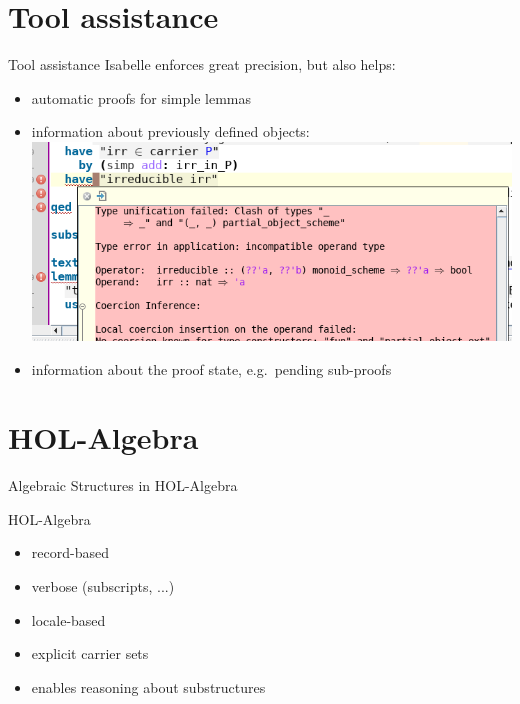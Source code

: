 \documentclass[%
	sans,
	12pt,
]{beamer}
\newcommand{\high}[1]{{\usebeamercolor[fg]{structure} #1}}
\begin{document}
\section{Tool assistance}
\begin{frame}{Tool assistance}%
Isabelle enforces great precision, but also helps:
\begin{itemize}
	\item automatic proofs for simple lemmas\pause %
	\item information about previously defined objects: \pause
	\includegraphics[width=0.7\linewidth]{"type_error"} \pause
	\item information about the proof state, e.g.\ pending sub-proofs
\end{itemize}
\end{frame}

\section{HOL-Algebra}
\begin{frame}
\begin{center}
\huge\high{Algebraic Structures in HOL-Algebra}%
\end{center}
\end{frame}

\begin{frame}{HOL-Algebra}
\begin{itemize}
	\item record-based \pause%
	\item verbose (subscripts, ...) \pause%
	\item locale-based \pause%
	\item explicit carrier sets \pause
	\item enables reasoning about substructures	%
\end{itemize}
\end{frame}
\end{document}
